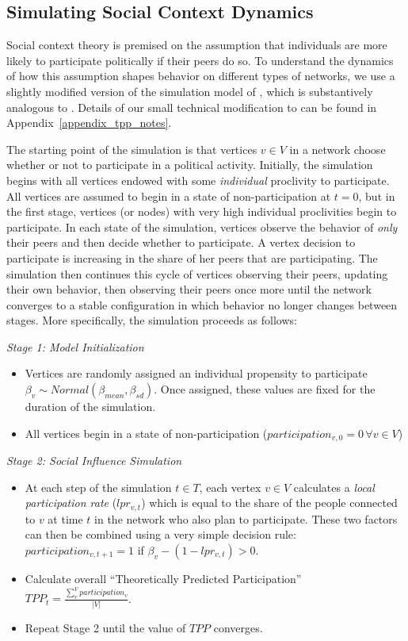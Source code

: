 \documentclass[12pt]{article}
\begin{document}
\subsection{Simulating Social Context Dynamics}\label{section_simulation}

Social context theory is premised on the assumption that individuals are more likely to participate politically if their peers do so. To understand the dynamics of how this assumption shapes behavior on different types of networks, we use a slightly modified version of the simulation model of \cite{Siegel:2009vi}, which is substantively analogous to \cite{Rolfe:2012ka}. Details of our small technical modification to \cite{Siegel:2009vi} can be found in Appendix~\ref{appendix_tpp_notes}.

The starting point of the simulation is that vertices $v \in V$ in a network choose whether or not to participate in a political activity. Initially, the simulation begins with all vertices endowed with some {\it individual} proclivity to participate. All vertices are assumed to begin in a state of non-participation at $t=0$, but in the first stage, vertices (or nodes) with very high individual proclivities begin to participate. In each state of the simulation, vertices observe the behavior of {\it only} their peers and then decide whether to  participate. A vertex decision to participate is increasing in the share of her peers that are participating. %
The simulation then continues this cycle of vertices observing their peers, updating their own behavior, then observing their peers once more until the network converges to a stable configuration in which behavior no longer changes between stages. More specifically, the simulation proceeds as follows:

\emph{Stage 1: Model Initialization}
	 \begin{itemize}
 	  	\item Vertices are randomly assigned an individual propensity to participate $\beta_v\sim Normal(\beta_{mean}, \beta_{sd})$. Once assigned, these values are fixed for the duration of the simulation.
 		  \item All vertices begin in a state of non-participation ($participation_{v,0} = 0 \, \forall v \in V$)
	  \end{itemize}
\emph{Stage 2: Social Influence Simulation}
	   \begin{itemize}
        \item At each step of the simulation $t \in T$, each vertex $v \in V$ calculates a \emph{local participation rate} ($lpr_{v,t}$) which is equal to the share of the people connected to $v$ at time $t$ in the network who also plan to participate. These two factors can then be combined using a very simple decision rule: $participation_{v,t+1} = 1$ if $\beta_v - (1-lpr_{v,t}) > 0$.
        \item Calculate overall ``Theoretically Predicted Participation'' $TPP_t = \frac{\sum_{v}^V participation_v}{|V|}$.
        \item Repeat Stage 2 until the value of $TPP$ converges.
    \end{itemize}
\end{document}
